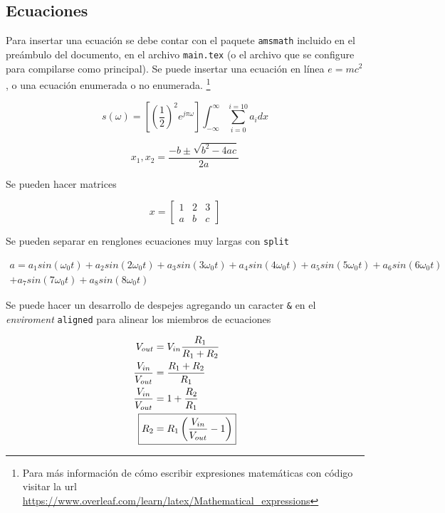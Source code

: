 \subsection{Ecuaciones}

Para insertar una ecuación se debe contar con el paquete \texttt{amsmath} incluido en el preámbulo del documento, en el archivo \texttt{main.tex} (o el archivo que se configure para compilarse como principal). Se puede insertar una ecuación en línea $e=mc^2$, o una ecuación enumerada o no enumerada. \footnote{Para más información de cómo escribir expresiones matemáticas con código visitar la url \url{https://www.overleaf.com/learn/latex/Mathematical_expressions}}

\begin{equation}
    s(\omega) = \left[ \left(\frac{1}{2}\right)^2 e^{j \pi \omega} \right] \int_{-\infty}^{\infty} \sum_{i=0}^{i=10} a_i dx
    \label{eq:algun_nombre}
\end{equation}

\begin{equation*}
    x_1,x_2 = \frac{-b \pm \sqrt{b^2 -4ac} }{2a}
\end{equation*}

Se pueden hacer matrices

\begin{equation}
    x = \begin{bmatrix}
        1 & 2 & 3\\
        a & b & c
        \end{bmatrix}
\end{equation}

Se pueden separar en renglones ecuaciones muy largas con \texttt{split}

\begin{equation}
    \begin{split}
        a = a_1 sin(\omega_0 t) + a_2 sin(2\omega_0 t) + a_3 sin(3\omega_0 t) + a_4 sin(4\omega_0 t) + a_5 sin(5\omega_0 t) + a_6 sin(6\omega_0 t) \\ + a_7 sin(7\omega_0 t) + a_8 sin(8\omega_0 t)
    \end{split}
\end{equation}

Se puede hacer un desarrollo de despejes agregando un caracter \texttt{\&} en el \textit{enviroment} \texttt{aligned} para alinear los miembros de ecuaciones

\begin{equation}
    \begin{split}
        V_{out} &= V_{in} \frac{R_1}{R_1+R_2} \\
        \frac{V_{in}}{V_{out}} &= \frac{R_1+R_2}{R_1} \\
        \frac{V_{in}}{V_{out}} &= 1+\frac{R_2}{R_1} \\
        \Aboxed{R_2 &= R_1 \left( \frac{V_{in}}{V_{out}} - 1 \right)}
    \end{split}
\end{equation}

